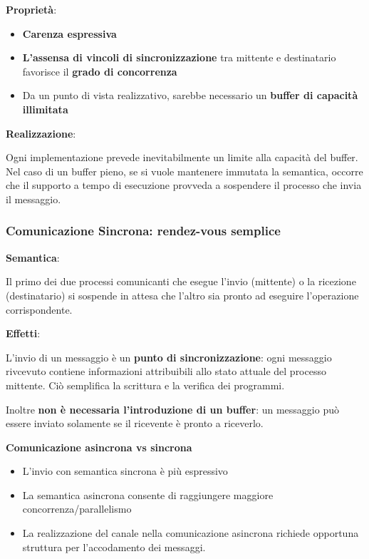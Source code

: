 \documentclass{article}
\begin{document}
\vspace{3mm}
\textbf{Proprietà}:

\begin{itemize}
    \item \textbf{Carenza espressiva}
    \item \textbf{L'assensa di vincoli di sincronizzazione} tra mittente e destinatario favorisce il \textbf{grado di concorrenza}
    \item Da un punto di vista realizzativo, sarebbe necessario un \textbf{buffer di capacità illimitata}
\end{itemize}

\vspace{3mm}
\textbf{Realizzazione}:

Ogni implementazione prevede inevitabilmente un limite alla capacità del buffer. Nel caso di un buffer pieno, se si vuole mantenere immutata la semantica, occorre che il supporto
a tempo di esecuzione provveda a sospendere il processo che invia il messaggio.

\subsubsection{Comunicazione Sincrona: rendez-vous semplice}

\textbf{Semantica}:

Il primo dei due processi comunicanti che esegue l'invio (mittente) o la ricezione (destinatario) si sospende in attesa che l'altro sia pronto ad eseguire l'operazione corrispondente.

\vspace{3mm}
\textbf{Effetti}:

L'invio di un messaggio è un \textbf{punto di sincronizzazione}: ogni messaggio rivcevuto contiene informazioni attribuibili allo stato attuale del processo mittente. Ciò semplifica la scrittura
e la verifica dei programmi.

\vspace{3mm}
Inoltre \textbf{non è necessaria l'introduzione di un buffer}: un messaggio può essere inviato solamente se il ricevente è pronto a riceverlo.

\vspace{5mm}
\textbf{Comunicazione asincrona vs sincrona}
\begin{itemize}
    \item L'invio con semantica sincrona è più espressivo
    \item La semantica asincrona consente di raggiungere maggiore concorrenza/parallelismo
    \item La realizzazione del canale nella comunicazione asincrona richiede opportuna struttura per l'accodamento dei messaggi.
\end{itemize}
\end{document}
